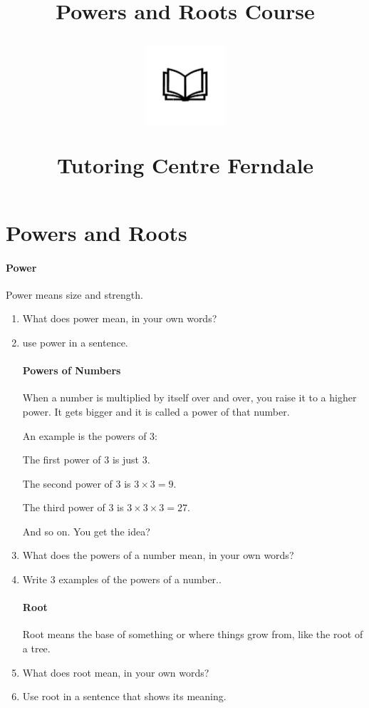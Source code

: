 \documentclass[12pt]{article}
\title{Powers and Roots Course\\
\begin{center}
\includegraphics[width=4em]{ApS_logo.png}
\end{center}
\begin{normalsize}Tutoring Centre Ferndale \end{normalsize}}
\author{}
\date{}
\begin{document}
\maketitle

\section*{Powers and Roots}

\paragraph{Power}
Power means size and strength.\\

\begin{enumerate}

\item What does power mean, in your own words?
\item use power in a sentence.

\paragraph{Powers of Numbers}
When a number is multiplied by itself over and over, you raise it to a higher power. It gets bigger and it is called a power of that number.

\vspace{14pt}
An example is the powers of 3:

The first power of 3 is just 3.

The second power of 3 is $3 \times 3 = 9.$

The third power of 3 is $3 \times 3 \times 3 = 27.$

\vspace{14pt}
And so on. You get the idea?

\item What does the powers of a number mean, in your own words?
\item Write 3 examples of the powers of a number..

\paragraph{Root}
Root means the base of something or where things grow from, like the root of a tree.

\item What does root mean, in your own words?
\item Use root in a sentence that shows its meaning.


\end{enumerate}
\end{document}
